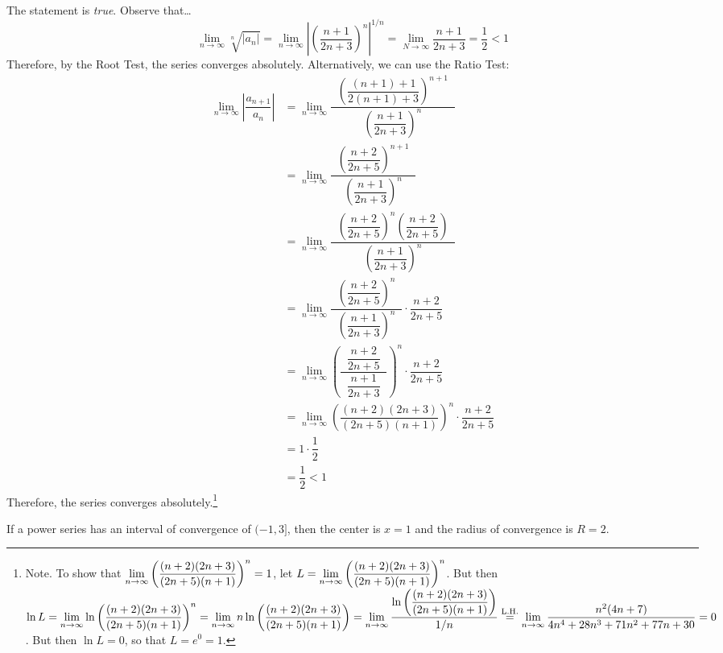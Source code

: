 \documentclass[11pt,letterpaper]{article}
\begin{document}
\sol The statement is \textit{true}. Observe that\dots
	\[
	\lim_{n \to \infty} \sqrt[n]{|a_n|}= \lim_{n \to \infty} \left| \left( \dfrac{n + 1}{2n + 3} \right)^n \right|^{1/n}= \lim_{N \to \infty} \dfrac{n + 1}{2n + 3}= \dfrac{1}{2} < 1
	\]
Therefore, by the Root Test, the series converges absolutely. Alternatively, we can use the Ratio Test:
	\[
	\begin{aligned}
	\lim_{n \to \infty} \left| \dfrac{a_{n+1}}{a_n} \right|&= \lim_{n \to \infty} \dfrac{\;\;\left( \dfrac{(n +1) + 1}{2(n + 1)+ 3} \right)^{n+1}\;\;}{\left( \dfrac{n + 1}{2n + 3} \right)^n} \\
	&= \lim_{n \to \infty} \dfrac{\;\;\left( \dfrac{n + 2}{2n + 5} \right)^{n+1}\;\;}{\left( \dfrac{n + 1}{2n + 3} \right)^n} \\\
	&= \lim_{n \to \infty} \dfrac{\;\;\left( \dfrac{n + 2}{2n + 5} \right)^n \left( \dfrac{n + 2}{2n + 5} \right)\;\;}{\left( \dfrac{n + 1}{2n + 3} \right)^n} \\
	&= \lim_{n \to \infty} \dfrac{\;\;\left( \dfrac{n + 2}{2n + 5} \right)^n\;\;}{\left( \dfrac{n + 1}{2n + 3} \right)^n} \cdot  \dfrac{n + 2}{2n + 5} \\
	&= \lim_{n \to \infty} \left( \dfrac{\;\;\dfrac{n + 2}{2n + 5}\;\;}{\dfrac{n + 1}{2n + 3}} \right)^n \cdot \dfrac{n + 2}{2n + 5} \\
	&= \lim_{n \to \infty} \left( \dfrac{(n + 2)(2n + 3)}{(2n + 5)(n + 1)} \right)^n \cdot \dfrac{n + 2}{2n + 5} \\
	&= 1 \cdot \dfrac{1}{2} \\
	&= \dfrac{1}{2} < 1
	\end{aligned}
	\]
Therefore, the series converges absolutely.\footnote{\tiny Note. To show that $\displaystyle\lim_{n \to \infty} \left( \dfrac{(n + 2)(2n + 3)}{(2n + 5)(n + 1)} \right)^n= 1$, let $\displaystyle L= \lim_{n \to \infty} \left( \dfrac{(n + 2)(2n + 3)}{(2n + 5)(n + 1)} \right)^n$. But then $\displaystyle \ln L= \lim_{n \to \infty} \ln \left( \dfrac{(n + 2)(2n + 3)}{(2n + 5)(n + 1)} \right)^n= \lim_{n \to \infty} n \ln \left( \dfrac{(n + 2)(2n + 3)}{(2n + 5)(n + 1)} \right)= \lim_{n \to \infty} \dfrac{\ln \left( \dfrac{(n + 2)(2n + 3)}{(2n + 5)(n + 1)} \right)}{1/n} \stackrel{\text{L.H.}}{=} \lim_{n \to \infty} \dfrac{n^2(4n + 7)}{4n^4 + 28n^3 + 71n^2 + 77n + 30}= 0$. But then $\ln L= 0$, so that $L= e^0= 1$.} \pvspace{1.3cm}



 If a power series has an interval of convergence of $(-1, 3]$, then the center is $x= 1$ and the radius of convergence is $R= 2$. \pspace
\end{document}

